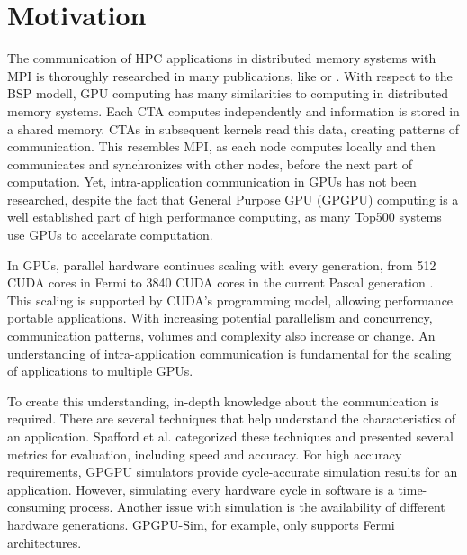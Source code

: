 \chapter{Motivation}
The communication of HPC applications in distributed memory systems with MPI is thoroughly researched in many publications, like  \cite{Klenk} or \cite{Riesen:2006:CP:1898699.1898795}.
With respect to the BSP modell, GPU computing has many similarities to computing in distributed memory systems. Each CTA computes independently and information is stored in a shared memory. CTAs in subsequent kernels read this data, creating patterns of communication. This resembles MPI, as each node computes locally and then communicates and synchronizes with other nodes, before the next part of computation.
Yet, intra-application communication in GPUs has not been researched, despite the fact that General Purpose GPU (GPGPU) computing is a well established part of high performance computing, as many Top500 
systems \cite{Top500} use GPUs to accelarate computation. 

In GPUs, parallel hardware continues scaling with every generation, from 512 CUDA cores in Fermi  \cite{FermiPaper} to 3840 CUDA cores in the current Pascal generation \cite{PascalPaper}. This scaling is supported by CUDA's programming model, allowing performance portable applications. With increasing potential parallelism and concurrency, communication patterns, volumes and complexity also increase or change.
An understanding of intra-application communication is fundamental for the scaling of applications to multiple
GPUs.

To create this understanding, in-depth knowledge about the communication is required. There are 
several techniques that help understand the characteristics of an application.
Spafford et al. \cite{Spafford:2012:ADS:2388996.2389110} categorized these techniques and presented several 
metrics for evaluation, including speed and accuracy. For high accuracy requirements, GPGPU simulators provide cycle-accurate simulation results for an application. However, simulating every hardware cycle in software is a time-consuming process. 
Another issue with simulation is the availability of different hardware generations. GPGPU-Sim, for example, only supports Fermi architectures. \cite{gpgpu}

